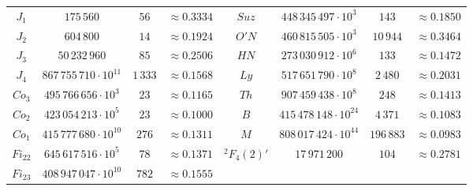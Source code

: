 \documentclass{daj}
\theoremstyle{definition}
\theoremstyle{remark}
\begin{document}
{\begin{table}
\begin{tabular}{| c | c c c || c | c c c |}
		\phantom{$\dfrac{1^1}{1_{1_1}}$}\hspace{-6mm}
		$J_1$ & $175\,560$ & $56$ & $\approx 0.3334$ &
		$Suz$ & $448\,345\,497 \cdot 10^3$ & $143$ & $\approx 0.1850$ \\
		
		\phantom{$\dfrac{1^1}{1_{1_1}}$}\hspace{-6mm}
		$J_2$ & $604\,800$ & $14$ & $\approx 0.1924$ &
		$O'N$ & $460\,815\,505\cdot 10^3$ & $10\,944$ & $\approx 0.3464$ \\
		
		\phantom{$\dfrac{1^1}{1_{1_1}}$}\hspace{-6mm}
		$J_3$ & $50\,232\,960$ & $85$ & $\approx 0.2506$ &
		$HN$ & $273\,030\,912\cdot 10^6$ & $133$ & $\approx 0.1472$ \\
		
		\phantom{$\dfrac{1^1}{1_{1_1}}$}\hspace{-6mm}
		$J_4$ & $867\,755\,710\cdot 10^{11}$ & $1\,333$ & $\approx 0.1568$ &
		$Ly$ & $517\,651\,790\cdot 10^8$ & $2\,480$ & $\approx 0.2031$ \\
		
		\phantom{$\dfrac{1^1}{1_{1_1}}$}\hspace{-6mm}
		$Co_3$ & $495\,766\,656\cdot 10^3$ & $23$ & $\approx 0.1165$ &
		$Th$ & $907\,459\,438\cdot 10^8$ & $248$ & $\approx 0.1413$ \\
		
		\phantom{$\dfrac{1^1}{1_{1_1}}$}\hspace{-6mm}
		$Co_2$ & $423\,054\,213\cdot 10^5$ & $23$ & $\approx 0.1000$ &
		$B$ & $415\,478\,148\cdot 10^{24}$ & $4\,371$& $\approx 0.1083$ \\
		
		\phantom{$\dfrac{1^1}{1_{1_1}}$}\hspace{-6mm}
		$Co_1$ & $415\,777\,680\cdot 10^{10}$ & $276$ & $\approx 0.1311$ &
		$M$ & $808\,017\,424\cdot 10^{44}$ & $196\,883$ & $\approx 0.0983$ \\
		
		\phantom{$\dfrac{1^1}{1_{1_1}}$}\hspace{-6mm}
		$Fi_{22}$ & $645\,617\,516\cdot 10^5$ & $78$ & $\approx 0.1371$ &
		$^2F_4(2)'$ & $17\,971\,200$ & $104$ & $\approx 0.2781$ \\
		
		\phantom{$\dfrac{1^1}{1_{1_1}}$}\hspace{-6mm}
		$Fi_{23}$ & $408\,947\,047\cdot 10^{10}$ & $782$ & $\approx 0.1555$ &
		$ $ & $ $ & $ $ & $ $ \\
		\hline
		
	\end{tabular}
\end{table}
}
\end{document}
